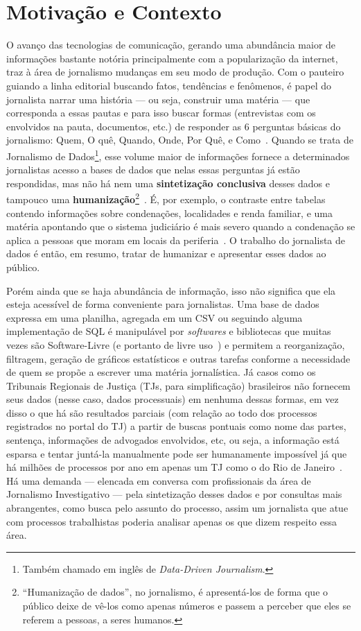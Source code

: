 \section{Motivação e Contexto~\label{sec:Motivação-e-Contexto}}

O avanço das tecnologias de comunicação, gerando uma abundância maior de
informações bastante notória principalmente com a popularização da internet,
traz à área de jornalismo mudanças em seu modo de produção. Com o pauteiro
guiando a linha editorial buscando fatos, tendências e fenômenos, é papel do
jornalista narrar uma história --- ou seja, construir uma matéria ---  que
corresponda a essas pautas e para isso buscar formas (entrevistas com os
envolvidos na pauta, documentos, etc.) de responder as 6 perguntas básicas do
jornalismo: Quem, O quê, Quando, Onde, Por Quê, e
Como~\cite{ijnet:examinando-perguntas-jornalismo}. Quando se trata de
Jornalismo de Dados\footnote{Também chamado em inglês de \textit{Data-Driven
Journalism}.}, esse volume maior de informações fornece a determinados
jornalistas acesso a bases de dados que nelas essas perguntas já estão
respondidas, mas não há nem uma \textbf{sintetização conclusiva} desses dados e
tampouco uma \textbf{humanização}\footnote{``Humanização de dados'', no
jornalismo, é apresentá-los de forma que o público deixe de vê-los como apenas
números e passem a perceber que eles se referem a pessoas, a seres
humanos.}~\cite{ijnet:como-humanizar-dados}. É, por exemplo, o contraste entre
tabelas contendo informações sobre condenações, localidades e renda familiar, e
uma matéria apontando que o sistema judiciário é mais severo quando a
condenação se aplica a pessoas que moram em locais da
periferia~\cite{news:sentenças-mais-severas-para-periferia}. O trabalho do
jornalista de dados é então, em resumo, tratar de humanizar e apresentar esses
dados ao público.

Porém ainda que se haja abundância de informação, isso não significa que ela
esteja acessível de forma conveniente para jornalistas. Uma base de dados
expressa em uma planilha, agregada em um CSV ou seguindo alguma implementação
de SQL é manipulável por \textit{softwares} e bibliotecas que muitas vezes são
Software-Livre (e portanto de livre uso~\cite{def:free-software}) e permitem a
reorganização, filtragem, geração de gráficos estatísticos e outras tarefas
conforme a necessidade de quem se propõe a escrever uma matéria jornalística.
Já casos como os Tribunais Regionais de Justiça (TJs, para simplificação)
brasileiros não fornecem seus dados (nesse caso, dados processuais) em nenhuma
dessas formas, em vez disso o que há são resultados parciais (com relação ao
todo dos processos registrados no portal do TJ) a partir de buscas pontuais
como nome das partes, sentença, informações de advogados envolvidos, etc, ou
seja, a informação está esparsa e tentar juntá-la manualmente pode ser
humanamente impossível já que há milhões de processos por ano em apenas um TJ
como o do Rio de Janeiro~\cite{tjrj}. Há uma demanda --- elencada em conversa
com profissionais da área de Jornalismo Investigativo --- pela sintetização
desses dados e por consultas mais abrangentes, como busca pelo assunto do
processo, assim um jornalista que atue com processos trabalhistas poderia
analisar apenas os que dizem respeito essa área.

